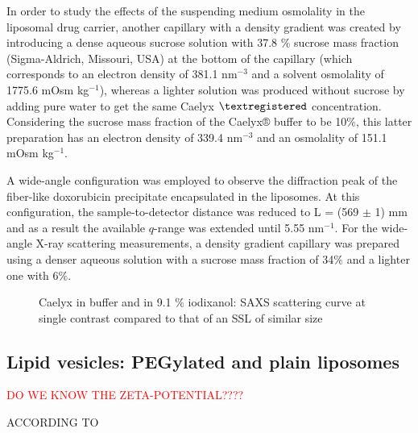 In order to study the effects of the suspending medium osmolality in the liposomal drug carrier, another capillary with a density gradient was created by introducing a dense aqueous sucrose solution with 37.8 $\%$ sucrose mass fraction (Sigma-Aldrich, Missouri, USA) at the bottom of the capillary (which corresponds to an electron density of 381.1 nm$^{-3}$ and a solvent osmolality of 1775.6 mOsm kg$^{-1}$), whereas a lighter solution was produced without sucrose by adding pure water to get the same Caelyx $\textregistered$ concentration. Considering the sucrose mass fraction of the Caelyx® buffer to be 10$\%$, this latter preparation has an electron density of 339.4 nm$^{-3}$ and an osmolality of 151.1 mOsm kg$^{-1}$. 

A wide-angle configuration was employed to observe the diffraction peak of the fiber-like doxorubicin precipitate encapsulated in the liposomes. At this configuration, the sample-to-detector distance was reduced to L = (569 $\pm$ 1) mm and as a result the available $q$-range was extended until 5.55 nm$^{-1}$. For the wide-angle X-ray scattering measurements, a density gradient capillary was prepared using a denser aqueous solution with a sucrose mass fraction of 34$\%$ and a lighter one with 6$\%$.

\begin{figure}
	\centering
		
		\caption{Caelyx in buffer and in 9.1 $\%$ iodixanol: SAXS scattering curve at single contrast compared to that of an SSL of similar size}
		\label{fig:CaelyxIodixanolSingleContrast}
\end{figure}

\subsection{Lipid vesicles: PEGylated and plain liposomes}
\label{sec:materials_SSL}

\textcolor{red}{DO WE KNOW THE ZETA-POTENTIAL????}

ACCORDING TO \cite{varga_osmotic_2014}

